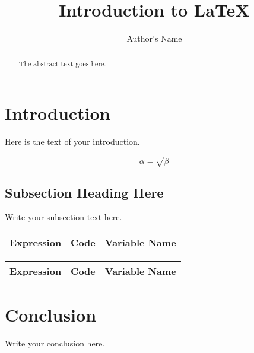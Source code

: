 \documentclass{article}
\begin{document}
\title{Introduction to \LaTeX{}}
\author{Author's Name}

\maketitle

\begin{abstract}
The abstract text goes here.
\end{abstract}

\section{Introduction}
Here is the text of your introduction.

\begin{equation}
    \label{simple_equation}
    \alpha = \sqrt{ \beta }
\end{equation}

\subsection{Subsection Heading Here}
Write your subsection text here.


\begin{table}[ht]
\begin{minipage}{.5\linewidth}
\centering
\begin{tabular}[t!]{ |c|r|r| } 
 \hline
 Expression & Code & Variable Name \\ 
 \hline

 \hline
\end{tabular}
\end{minipage}
\begin{minipage}{.5\linewidth}
\centering
\begin{tabular}[t!]{ |c|r|r| } 
 \hline
 Expression & Code & Variable Name \\ 
 \hline

 \hline
\end{tabular}
\end{minipage}
\end{table}



\section{Conclusion}
Write your conclusion here.
\end{document}
